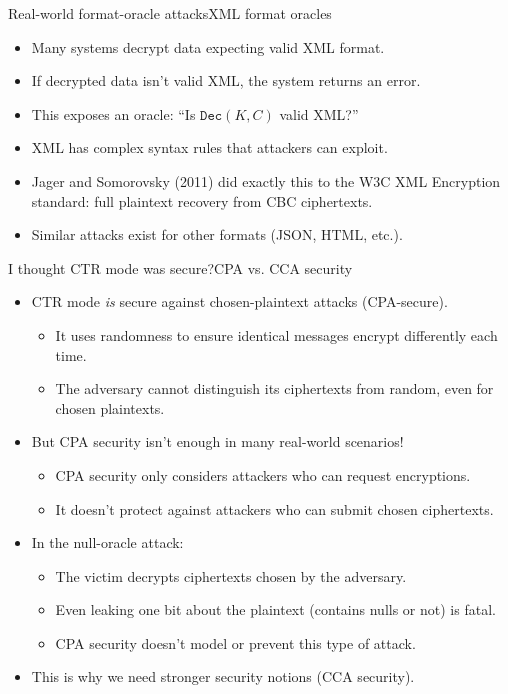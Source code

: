 \ifdefined\PRESENTATION\else\PassOptionsToClass{handout}{beamer}\fi\documentclass[aspectratio=169, lualatex]{beamer}
\begin{document}
\begin{frame}{Real-world format-oracle attacks}{XML format oracles}
	\begin{itemize}[<+->]
		\item Many systems decrypt data expecting valid XML format.
		\item If decrypted data isn't valid XML, the system returns an error.
		\item This exposes an oracle: ``Is $\texttt{Dec}(K, C)$ valid XML?''
		\item XML has complex syntax rules that attackers can exploit.
		\item Jager and Somorovsky (2011) did exactly this to the W3C XML Encryption standard: full plaintext recovery from CBC ciphertexts.
		\item Similar attacks exist for other formats (JSON, HTML, etc.).
	\end{itemize}
\end{frame}

\begin{frame}{I thought CTR mode was secure?}{CPA vs. CCA security}
	\begin{itemize}[<+->]
		\item CTR mode \textit{is} secure against chosen-plaintext attacks (CPA-secure).
		      \begin{itemize}
			      \item It uses randomness to ensure identical messages encrypt differently each time.
			      \item The adversary cannot distinguish its ciphertexts from random, even for chosen plaintexts.
		      \end{itemize}
		\item But CPA security isn't enough in many real-world scenarios!
		      \begin{itemize}
			      \item CPA security only considers attackers who can request encryptions.
			      \item It doesn't protect against attackers who can submit chosen ciphertexts.
		      \end{itemize}
		\item In the null-oracle attack:
		      \begin{itemize}
			      \item The victim decrypts ciphertexts chosen by the adversary.
			      \item Even leaking one bit about the plaintext (contains nulls or not) is fatal.
			      \item CPA security doesn't model or prevent this type of attack.
		      \end{itemize}
		\item This is why we need stronger security notions (CCA security).
	\end{itemize}
\end{frame}
\end{document}
